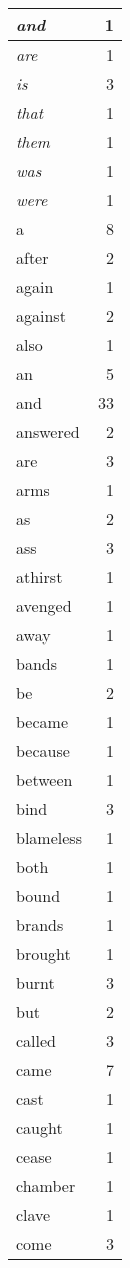 \begin{center}
\begin{longtable}{l|r}
\emph{and} & 1\\ \hline 
\emph{are} & 1\\ \hline 
\emph{is} & 3\\ \hline 
\emph{that} & 1\\ \hline 
\emph{them} & 1\\ \hline 
\emph{was} & 1\\ \hline 
\emph{were} & 1\\ \hline 
a & 8\\ \hline 
after & 2\\ \hline 
again & 1\\ \hline 
against & 2\\ \hline 
also & 1\\ \hline 
an & 5\\ \hline 
and & 33\\ \hline 
answered & 2\\ \hline 
are & 3\\ \hline 
arms & 1\\ \hline 
as & 2\\ \hline 
ass & 3\\ \hline 
athirst & 1\\ \hline 
avenged & 1\\ \hline 
away & 1\\ \hline 
bands & 1\\ \hline 
be & 2\\ \hline 
became & 1\\ \hline 
because & 1\\ \hline 
between & 1\\ \hline 
bind & 3\\ \hline 
blameless & 1\\ \hline 
both & 1\\ \hline 
bound & 1\\ \hline 
brands & 1\\ \hline 
brought & 1\\ \hline 
burnt & 3\\ \hline 
but & 2\\ \hline 
called & 3\\ \hline 
came & 7\\ \hline 
cast & 1\\ \hline 
caught & 1\\ \hline 
cease & 1\\ \hline 
chamber & 1\\ \hline 
clave & 1\\ \hline 
come & 3\\ \hline 

\end{longtable}
\end{center}
